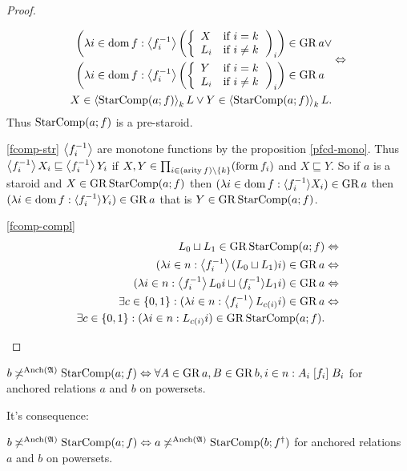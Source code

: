 \begin{proof}
\begin{widedisorder}
\begin{eqnarray*}
\begin{aligned}\left(\lambda i\in\operatorname{dom} f:\left\langle f_{i}^{-1}\right\rangle\left(\left\{ \begin{array}{ll}
X & \text{if }i=k\\
L_{i} & \text{if }i\neq k
\end{array}\right.\right)_{i}\right)\in\operatorname{GR} a & \vee\\
\left(\lambda i\in\operatorname{dom} f:\left\langle f_{i}^{-1}\right\rangle\left(\left\{ \begin{array}{ll}
Y & \text{if }i=k\\
L_{i} & \text{if }i\neq k
\end{array}\right.\right)_{i}\right)\in\operatorname{GR} a
\end{aligned}
 & \Leftrightarrow\\
X\in\left\langle \operatorname{StarComp}(a;f)\right\rangle_{k}L\vee Y\in\left\langle \operatorname{StarComp}(a;f)\right\rangle_{k}L.
\end{eqnarray*}
Thus $\operatorname{StarComp}(a;f)$ is a pre-staroid.
\item [{\ref{fcomp-str}}] $\left\langle f_{i}^{-1}\right\rangle$ are monotone functions by
the proposition \ref{pfcd-mono}. Thus $\left\langle f_{i}^{-1}\right\rangle X_{i}\sqsubseteq\left\langle f_{i}^{-1}\right\rangle Y_{i}$
if $X,Y\in\prod_{i\in(\operatorname{arity} f)\setminus\{k\}}(\operatorname{form} f_{i})$ and
$X\sqsubseteq Y$. So if $a$ is a staroid and $X\in\operatorname{GR}\operatorname{StarComp}(a;f)$
then $(\lambda i\in\operatorname{dom} f:\langle f_{i}^{-1}\rangle X_{i})\in\operatorname{GR} a$
then $(\lambda i\in\operatorname{dom} f:\langle f_{i}^{-1}\rangle Y_{i})\in\operatorname{GR} a$
that is $Y\in\operatorname{GR}\operatorname{StarComp}(a;f)$.
\item [{\ref{fcomp-compl}}] ~
\begin{eqnarray*}
L_{0}\sqcup L_{1}\in\operatorname{GR}\operatorname{StarComp}(a;f) & \Leftrightarrow\\
(\lambda i\in n:\left\langle f_{i}^{-1}\right\rangle(L_{0}\sqcup L_{1})i)\in\operatorname{GR} a & \Leftrightarrow\\
(\lambda i\in n:\left\langle f_{i}^{-1}\right\rangle L_{0}i\sqcup\langle f_{i}^{-1}\rangle L_{1}i)\in\operatorname{GR} a & \Leftrightarrow\\
\exists c\in\{0,1\}:(\lambda i\in n:\left\langle f_{i}^{-1}\right\rangle L_{c(i)}i)\in\operatorname{GR} a & \Leftrightarrow\\
\exists c\in\{0,1\}:(\lambda i\in n:L_{c(i)}i)\in\operatorname{GR}\operatorname{StarComp}(a;f).
\end{eqnarray*}

\end{widedisorder}
\end{proof}
\begin{conjecture}
$b\not\asymp^{\operatorname{Anch}(\mathfrak{A})}\operatorname{StarComp}(a;f)\Leftrightarrow\forall A\in\operatorname{GR} a,B\in\operatorname{GR} b,i\in n:A_{i}\mathrel{\left[f_{i}\right]}B_{i}$
for anchored relations $a$ and $b$ on powersets.
\end{conjecture}
It's consequence:
\begin{conjecture}
$b\not\asymp^{\operatorname{Anch}(\mathfrak{A})}\operatorname{StarComp}(a;f)\Leftrightarrow a\not\asymp^{\operatorname{Anch}(\mathfrak{A})}\operatorname{StarComp}(b;f^{\dagger})$
for anchored relations $a$ and $b$ on powersets.
\end{conjecture}


